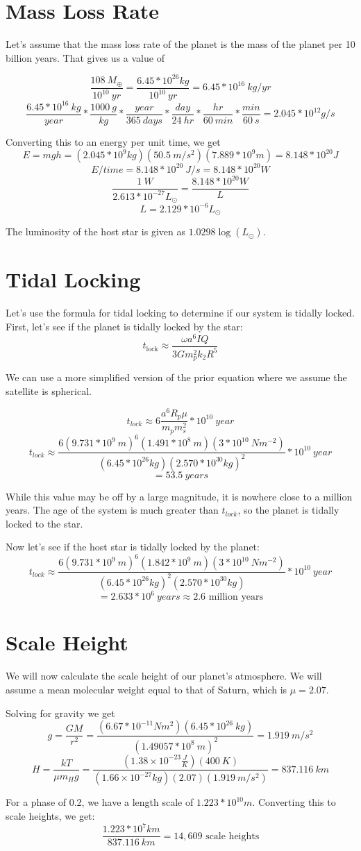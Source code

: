\documentclass{article}
\begin{document}
\section{Mass Loss Rate}
Let's assume that the mass loss rate of the planet is the mass of the planet per 10 billion years. That gives us a value of 

$$\frac{108\:M_\oplus}{10^{10}\:yr}=\frac{6.45*10^{26}kg}{10^{10}\:yr}=6.45*10^{16}\:kg/yr$$
$$\frac{6.45*10^{16}\:kg}{year}*\frac{1000\:g}{kg}*\frac{year}{365\:days}*\frac{day}{24\:hr}*\frac{hr}{60\:min}*\frac{min}{60\:s}=2.045*10^{12}g/s$$

Converting this to an energy per unit time, we get
$$E=mgh=(2.045*10^{9}kg)(50.5\:m/s^2)(7.889*10^9m)=8.148*10^{20}J$$
$$E/time={8.148*10^{20}\:J/s}=8.148*10^{20}W$$
$$\frac{1\:W}{2.613*10^{-27}L_\odot}=\frac{8.148*10^{20}W}{L}$$
$$L=2.129*10^{-6}L_\odot$$

The luminosity of the host star is given as $1.0298 \log(L_\odot)$.

\section{Tidal Locking}
Let's use the formula for tidal locking to determine if our system is tidally locked. First, let's see if the planet is tidally locked by the star: 
$$t_{\text{lock}} \approx \frac{\omega a^6 I Q}{3 G m_p^2 k_2 R^5}$$

We can use a more simplified version of the prior equation where we assume the satellite is spherical.

$$t_{lock}\approx 6\frac{a^6 R_p\mu}{m_pm_s^2}*10^{10}\:year$$
$$t_{lock}\approx \frac{6(9.731*10^9\:m)^6 (1.491*10^8\:m)(3*10^{10}\: Nm^{-2})}{(6.45*10^{26}kg)(2.570*10^{30}kg)^2}*10^{10}\:year$$
$$=53.5\:years$$

While this value may be off by a large magnitude, it is nowhere close to a million years. The age of the system is much greater than $t_{lock}$, so the planet is tidally locked to the star.

Now let's see if the host star is tidally locked by the planet:
$$t_{lock}\approx \frac{6(9.731*10^9\:m)^6 (1.842*10^9\:m)(3*10^{10}\: Nm^{-2})}{(6.45*10^{26}kg)^2(2.570*10^{30}kg)}*10^{10}\:year$$
$$=2.633*10^6\:years\approx 2.6 \text{ million years}$$

\section{Scale Height}
We will now calculate the scale height of our planet's atmosphere. We will assume a mean molecular weight equal to that of Saturn, which is $\mu=2.07$.

Solving for gravity we get
$$g=\frac{GM}{r^2}=\frac{(6.67*10^{-11}Nm^2)(6.45*10^{26}\:kg)}{(1.49057*10^8\:m)^2}=1.919\:m/s^2$$
$$H=\frac{kT}{\mu m_H g}=\frac{(1.38 \times 10^{-23} \frac{J}{K})(400\:K)}{(1.66 \times 10^{-27} kg)(2.07)(1.919\:m/s^2)}=837.116\:km$$

For a phase of 0.2, we have a length scale of $1.223*10^{10}m$. Converting this to scale heights, we get:
$$\frac{1.223*10^{7}km}{837.116\:km}=14,609 \text{ scale heights}$$
\end{document}
